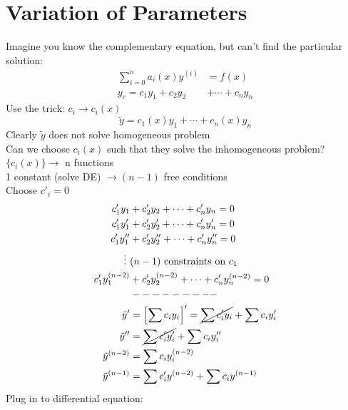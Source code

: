\documentclass[Maths.tex]{subfiles}
\begin{document}
\section{Variation of Parameters}
Imagine you know the complementary equation, but can't find the particular solution:
\begin{align*}
    \sum_{i=0}^n a_i(x)y^{(i)} &= f(x) \\
    y_c = c_1y_1 + c_2y_2 &+ \cdots + c_ny_n
\end{align*}
Use the trick: $c_i \to c_i(x)$
\begin{equation*}
    \tilde{y} = c_1(x)y_1 + \cdots + c_n(x)y_n
\end{equation*}
Clearly $\tilde{y}$ does not solve homogeneous problem \\
Can we choose $c_i(x)$ such that they solve the inhomogeneous problem? \\
$\{c_i(x)\} \to$ n functions \\
1 constant (solve DE) $\to (n-1)$ free conditions \\
Choose $c'_i = 0$
\begin{align*}
    c'_1y_1 &+ c'_2y_2 + \cdots + c'_ny_n = 0 \\
    c'_1y'_1 &+ c'_2y'_2 + \cdots + c'_ny'_n = 0 \\
    c'_1y''_1 &+ c'_2y''_2 + \cdots + c'_ny''_n = 0 \\
    \vdots ~ &(n-1) \text{ constraints on }c_1 \\
    c'_1y^{(n-2)}_1 &+ c'_2y^{(n-2)}_2 + \cdots + c'_ny^{(n-2)}_n = 0 \\
    & --------- \\
    \tilde{y}' &= \left[\sum c_iy_i\right]' = \cancel{\sum c'_iy_i} + \sum c_iy'_i \\
    \tilde{y}'' &= \cancel{\sum c'_iy'_i} + \sum c_iy''_i \\
    \tilde{y}^{(n-2)} &= \sum c_iy_i^{(n-2)} \\
    \tilde{y}^{(n-1)} &= \sum c'_iy^{(n-2)} + \sum c_iy^{(n-1)}
\end{align*}
Plug in to differential equation:
\end{document}
